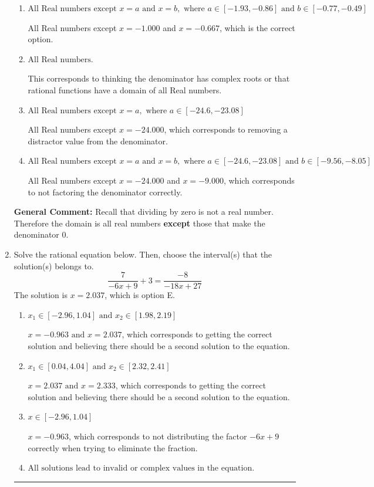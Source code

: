 \documentclass{extbook}[14pt]
\newcommand{\litem}[1]{\item #1

\rule{\textwidth}{0.4pt}}
\begin{document}
\begin{enumerate}
{\begin{enumerate}[label=\Alph*.]
All Real numbers except $x = -1.000$, which corresponds to removing only 1 value from the denominator.
\item \( \text{All Real numbers except } x = a \text{ and } x = b, \text{ where } a \in [-1.93, -0.86] \text{ and } b \in [-0.77, -0.49] \)

All Real numbers except $x = -1.000$ and $x = -0.667$, which is the correct option.
\item \( \text{All Real numbers.} \)

This corresponds to thinking the denominator has complex roots or that rational functions have a domain of all Real numbers.
\item \( \text{All Real numbers except } x = a, \text{ where } a \in [-24.6, -23.08] \)

All Real numbers except $x = -24.000$, which corresponds to removing a distractor value from the denominator.
\item \( \text{All Real numbers except } x = a \text{ and } x = b, \text{ where } a \in [-24.6, -23.08] \text{ and } b \in [-9.56, -8.05] \)

All Real numbers except $x = -24.000$ and $x = -9.000$, which corresponds to not factoring the denominator correctly.
\end{enumerate}

\textbf{General Comment:} Recall that dividing by zero is not a real number. Therefore the domain is all real numbers \textbf{except} those that make the denominator 0.
}
\litem{
Solve the rational equation below. Then, choose the interval(s) that the solution(s) belongs to.
\[ \frac{7}{-6x + 9} + 3 = \frac{-8}{-18x + 27} \]The solution is \( x = 2.037 \), which is option E.\begin{enumerate}[label=\Alph*.]
\item \( x_1 \in [-2.96, 1.04] \text{ and } x_2 \in [1.98,2.19] \)

$x = -0.963 \text{ and } x = 2.037$, which corresponds to getting the correct solution and believing there should be a second solution to the equation.
\item \( x_1 \in [0.04, 4.04] \text{ and } x_2 \in [2.32,2.41] \)

$x = 2.037 \text{ and } x = 2.333$, which corresponds to getting the correct solution and believing there should be a second solution to the equation.
\item \( x \in [-2.96,1.04] \)

$x = -0.963$, which corresponds to not distributing the factor $-6x + 9$ correctly when trying to eliminate the fraction.
\item \( \text{All solutions lead to invalid or complex values in the equation.} \)


\end{enumerate}}
\end{enumerate}
\end{document}
